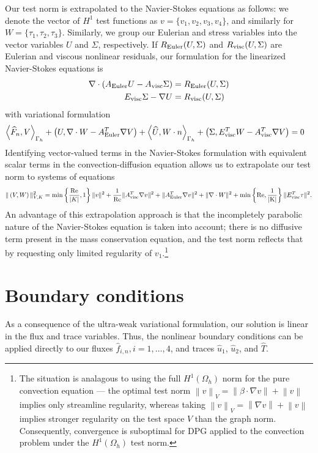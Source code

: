 \documentclass{article}
\newcommand{\grad}{\nabla}
\renewcommand{\div}{\grad \cdot}
\newcommand{\nor}[1]{\left\| #1 \right\|}
\newcommand{\Reyn}{\rm Re}
\newcommand{\Gh}{\Gamma_h}
\newcommand{\Oh}{\Omega_h}
\newcommand{\LRa}[1]{\left\langle #1 \right\rangle}
\begin{document}
Our test norm is extrapolated to the Navier-Stokes equations as follows: we denote the vector of $H^1$ test functions as $v=\{v_1,v_2,v_3,v_4\}$, and similarly for $W = \{\tau_1,\tau_2,\tau_3\}$. Similarly, we group our Eulerian and stress variables into the vector variables $U$ and $\Sigma$, respectively. If $R_{\rm Euler}(U,\Sigma)$ and $R_{\rm visc}(U,\Sigma)$ are Eulerian and viscous nonlinear residuals, our formulation for the linearized Navier-Stokes equations is
\begin{align*}
\div \left(A_{\rm Euler}U - A_{\rm visc}\Sigma\right) &= R_{\rm Euler}(U,\Sigma)\\
E_{\rm visc} \Sigma - \grad U &= R_{\rm visc}(U,\Sigma)
\end{align*}
with variational formulation
\begin{align*}
\LRa{\widehat{F}_n,V}_{\Gh} + \left(U,\div W - A_{\rm Euler}^T\grad  V\right) + \LRa{\widehat{U},W\cdot n}_{\Gh} + \left(\Sigma,E_{\rm visc}^TW - A_{\rm visc}^T\grad  V\right) &= 0
\end{align*}
Identifying vector-valued terms in the Navier-Stokes formulation with equivalent scalar terms in the convection-diffusion equation allows us to extrapolate our test norm to systems of equations
\[
\|\left(V,W\right)\|_{V,K}^2 = \min\left\{\frac{\Reyn}{|K|},1\right\}\|v\|^2 + \frac{1}{\Reyn} \|A_{\rm visc}^T\grad v\|^2 + \|A_{\rm Euler}^T \grad v\|^2 + \| \div W\|^2 + \min\left\{\Reyn,\frac{1}{|K|}\right\}\|E_{\rm visc}^T\tau\|^2.
\]
An advantage of this extrapolation approach is that the incompletely parabolic nature of the Navier-Stokes equation is taken into account; there is no diffusive term present in the mass conservation equation, and the test norm reflects that by requesting only limited regularity of $v_1$.\footnote{The situation is analagous to using the full $H^1(\Oh)$ norm for the pure convection equation --- the optimal test norm $\nor{v}_V = \nor{\beta\cdot \grad v} + \nor{v}$ implies only streamline regularity, whereas taking $\nor{v}_V = \nor{\grad v} + \nor{v}$ implies stronger regularity on the test space $V$ than the graph norm. Consequently, convergence is suboptimal for DPG applied to the convection problem under the $H^1(\Oh)$ test norm.}

\section{Boundary conditions}

As a consequence of the ultra-weak variational formulation, our solution is linear in the flux and trace variables. Thus, the nonlinear boundary conditions can be applied directly to our fluxes $\widehat{f}_{i,n}, i = 1,\ldots,4$, and traces $\widehat{u}_1$, $\widehat{u}_2$, and $\widehat{T}$. 
\end{document}
